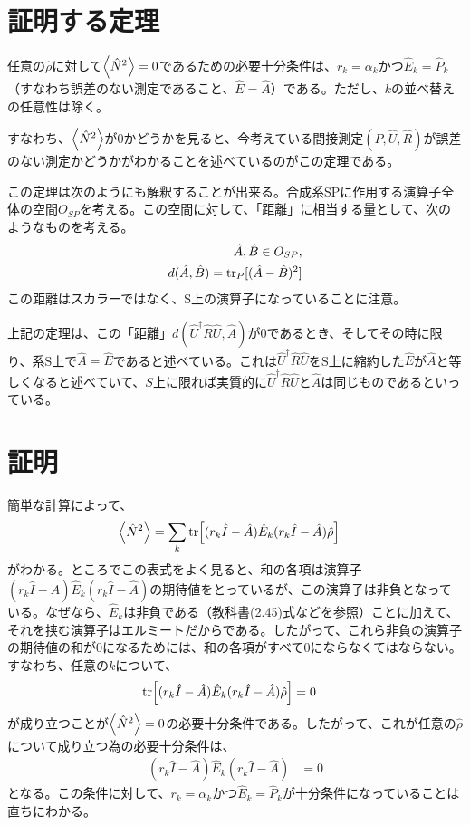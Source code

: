 \documentclass[uplatex,dvipdfmx, a4j]{jsarticle}
\newcommand{\ope}[1]{\hat{#1}}
\newcommand{\hc}[1]{{\ope{#1}}^\dagger}
\begin{document}
\section{証明する定理}
任意の$\ope{\rho}$に対して$\expval{\ope{N}^2}=0$であるための必要十分条件は、$r_k = \alpha_k$かつ$\ope{E}_k = \ope{P}_k$（すなわち誤差のない測定であること、$\ope{E}=\ope{A}$）である。ただし、$k$の並べ替えの任意性は除く。

すなわち、$\expval{\ope{N}^2}$が0かどうかを見ると、今考えている間接測定$(P, \ope{U}, \ope{R})$が誤差のない測定かどうかがわかることを述べているのがこの定理である。

この定理は次のようにも解釈することが出来る。合成系SPに作用する演算子全体の空間$O_{SP}$を考える。この空間に対して、「距離」に相当する量として、次のようなものを考える。
\begin{align}
	\ope{A}, \ope{B} \in O_{SP}, \\
	d(\ope{A}, \ope{B}) = \tr_{P}[(\ope{A}-\ope{B})^2]
\end{align}
この距離はスカラーではなく、S上の演算子になっていることに注意。

上記の定理は、この「距離」$d(\hc{U}\ope{R}\ope{U},\ope{A})$が0であるとき、そしてその時に限り、系S上で$\ope{A}=\ope{E}$であると述べている。これは$\hc{U}\ope{R}\ope{U}$をS上に縮約した$\ope{E}$が$\ope{A}$と等しくなると述べていて、$S$上に限れば実質的に$\hc{U}\ope{R}\ope{U}$と$\ope{A}$は同じものであるといっている。

\section{証明}
簡単な計算によって、
\begin{align}
	\expval{\ope{N}^2} &= \sum_k \tr[(r_k\ope{I}-\ope{A})\ope{E}_k(r_k\ope{I}-\ope{A})\ope{\rho}]
\end{align}
がわかる。ところでこの表式をよく見ると、和の各項は演算子$(r_k\ope{I}-\ope{A})\ope{E}_k(r_k\ope{I}-\ope{A})$の期待値をとっているが、この演算子は非負となっている。なぜなら、$\ope{E}_k$は非負である（教科書(2.45)式などを参照）ことに加えて、それを挟む演算子はエルミートだからである。したがって、これら非負の演算子の期待値の和が0になるためには、和の各項がすべて0にならなくてはならない。すなわち、任意の$k$について、
\begin{align}
	\tr[(r_k\ope{I}-\ope{A})\ope{E}_k(r_k\ope{I}-\ope{A})\ope{\rho}] &= 0
\end{align}
が成り立つことが$\expval{\ope{N}^2}=0$の必要十分条件である。したがって、これが任意の$\ope{\rho}$について成り立つ為の必要十分条件は、
\begin{align}
	(r_k\ope{I}-\ope{A})\ope{E}_k(r_k\ope{I}-\ope{A}) &= 0 \label{eq:condition}
\end{align}
となる。この条件に対して、$r_k = \alpha_k$かつ$\ope{E}_k = \ope{P}_k$が十分条件になっていることは直ちにわかる。
\end{document}
